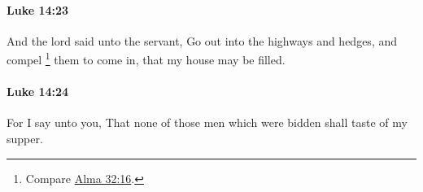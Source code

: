 		\paragraph{Luke 14:23} %
			\label{LUKE-14-23}

			And the lord said unto the servant, Go out into the highways and hedges, and compel%
				\footnote{%
					Compare \hyperref[ALMA-32-16]{Alma 32:16}.
					}
			them to come in, that my house may be filled.

			\begin{framed}
			\scriptsize
				\begin{compactdesc}
					\item[SBLG] 
				\end{compactdesc}
			\end{framed}

		\paragraph{Luke 14:24} %
			\label{LUKE-14-24}

			For I say unto you, That none of those men which were bidden shall taste of my supper.

